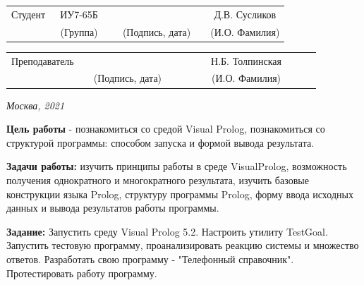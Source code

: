\documentclass[12pt, a4paper]{extarticle}
\begin{document}
\noindent
{}
\\

\noindent
{}
\\

\vspace{1.5cm}
\noindent
\begin{tabular}{l c c c c c}
	Студент      & ~ИУ7-65Б~               & \hspace{2.5cm} & \hspace{2cm}                 & &  Д.В. Сусликов \\\cline{2-2}\cline{4-4} \cline{6-6} 
	\hspace{3cm} & {\footnotesize(Группа)} &                & {\footnotesize(Подпись, дата)} & & {\footnotesize(И.О. Фамилия)}
\end{tabular}

\noindent
\begin{tabular}{l c c c c}
	Преподаватель & \hspace{5cm}   & \hspace{2cm}                 & & ~~~~~~Н.Б. Толпинская~~~~~~\\\cline{3-3} \cline{5-5} 
	\hspace{3cm}  &                & {\footnotesize(Подпись, дата)} & & {\footnotesize(И.О. Фамилия)}
\end{tabular}

\vspace{0.6cm}
\begin{center}	
	\vfill
	\large \textit {Москва, 2021}
\end{center}

\thispagestyle {empty}
\pagebreak

\clearpage


\textbf{Цель работы} - познакомиться со средой Visual Prolog, познакомиться со структурой программы: способом запуска и формой вывода результата.

\textbf{Задачи работы:} изучить принципы работы в среде VisualProlog, возможность получения однократного и многократного результата, изучить базовые конструкции языка Prolog, структуру программы Prolog, форму ввода исходных данных и вывода результатов работы программы.

\textbf{Задание:} Запустить среду Visual Prolog 5.2. Настроить утилиту TestGoal. Запустить тестовую программу, проанализировать реакцию системы и множество ответов. Разработать свою программу - "Телефонный справочник". Протестировать работу программу.
\end{document}
